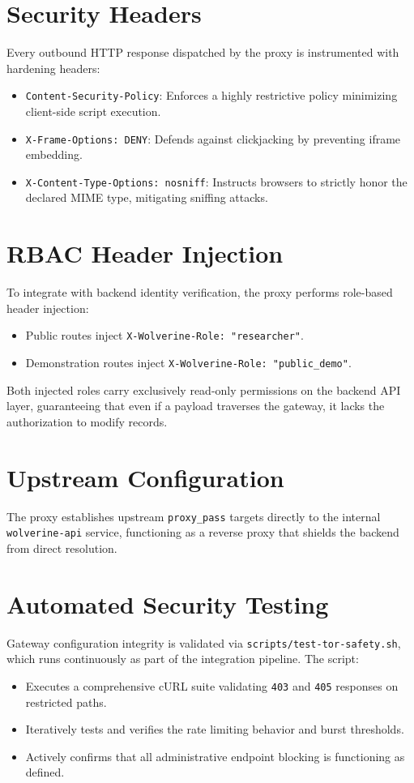 \section{Security Headers}
Every outbound HTTP response dispatched by the proxy is instrumented with hardening headers:
\begin{itemize}
    \item \texttt{Content-Security-Policy}: Enforces a highly restrictive policy minimizing client-side script execution.
    \item \texttt{X-Frame-Options: DENY}: Defends against clickjacking by preventing iframe embedding.
    \item \texttt{X-Content-Type-Options: nosniff}: Instructs browsers to strictly honor the declared MIME type, mitigating sniffing attacks.
\end{itemize}

\section{RBAC Header Injection}
To integrate with backend identity verification, the proxy performs role-based header injection:
\begin{itemize}
    \item Public routes inject \texttt{X-Wolverine-Role: "researcher"}.
    \item Demonstration routes inject \texttt{X-Wolverine-Role: "public\_demo"}.
\end{itemize}
Both injected roles carry exclusively read-only permissions on the backend API layer, guaranteeing that even if a payload traverses the gateway, it lacks the authorization to modify records.

\section{Upstream Configuration}
The proxy establishes upstream \texttt{proxy\_pass} targets directly to the internal \texttt{wolverine-api} service, functioning as a reverse proxy that shields the backend from direct resolution.

\section{Automated Security Testing}
Gateway configuration integrity is validated via \texttt{scripts/test-tor-safety.sh}, which runs continuously as part of the integration pipeline. The script:
\begin{itemize}
    \item Executes a comprehensive cURL suite validating \texttt{403} and \texttt{405} responses on restricted paths.
    \item Iteratively tests and verifies the rate limiting behavior and burst thresholds.
    \item Actively confirms that all administrative endpoint blocking is functioning as defined.
\end{itemize}

